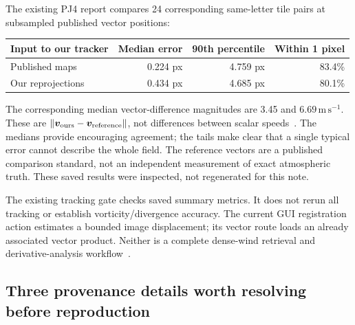\documentclass[11pt]{article}
\newcommand{\vel}{\bm{v}}
\newcommand{\ms}{\mathrm{m\,s^{-1}}}
\begin{document}
The existing PJ4 report compares 24 corresponding same-letter tile pairs
at subsampled published vector positions:
\begin{center}
\small
\begin{tabularx}{\linewidth}{@{}Xrrr@{}}
\toprule
Input to our tracker & Median error & 90th percentile & Within 1 pixel \\
\midrule
Published maps & 0.224 px & 4.759 px & 83.4\% \\
Our reprojections & 0.434 px & 4.685 px & 80.1\% \\
\bottomrule
\end{tabularx}
\end{center}
The corresponding median vector-difference magnitudes are 3.45 and
$6.69\,\ms$. These are $\|\vel_{\rm ours}-\vel_{\rm reference}\|$, not
differences between scalar speeds~\cite{repovalidation}. The medians provide
encouraging agreement; the tails make clear that a single typical error
cannot describe the whole field. The reference vectors are a published
comparison standard, not an independent measurement of exact atmospheric
truth. These saved results were inspected, not regenerated for this note.

The existing tracking gate checks saved summary metrics. It does not rerun
all tracking or establish vorticity/divergence accuracy. The current GUI
registration action estimates a bounded image displacement; its vector route
loads an already associated vector product. Neither is a complete dense-wind
retrieval and derivative-analysis workflow~\cite{repoapi}.

\subsection{Three provenance details worth resolving before reproduction}
\end{document}

